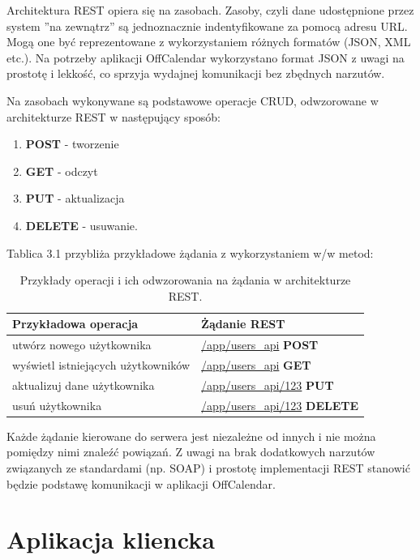 Architektura REST opiera się na zasobach. Zasoby, czyli dane udostępnione przez system ''na zewnątrz'' są jednoznacznie indentyfikowane za pomocą adresu URL. Mogą one być reprezentowane z wykorzystaniem różnych formatów (JSON, XML etc.). Na potrzeby aplikacji OffCalendar wykorzystano format JSON z uwagi na prostotę i lekkość, co sprzyja wydajnej komunikacji bez zbędnych narzutów.

Na zasobach wykonywane są podstawowe operacje CRUD, odwzorowane w architekturze REST w następujący sposób:

\begin{enumerate}
\item\textbf{POST} - tworzenie
\item \textbf{GET} - odczyt
\item \textbf{PUT} - aktualizacja
\item \textbf{DELETE} - usuwanie.
\end{enumerate}

Tablica 3.1 przybliża przykładowe żądania z wykorzystaniem w/w metod\cite{rest2}:

\begin{table}[h]
\centering
    \begin{tabular}{ | p{7cm} | p{7cm} | }
    \hline
    \textbf{Przykładowa operacja} & \textbf{Żądanie REST} \\ \hline
	utwórz nowego użytkownika & \url{/app/users_api} \textbf{POST}
	\\ \hline
	wyświetl istniejących użytkowników & \url{/app/users_api} \textbf{GET}
	\\ \hline
	aktualizuj dane użytkownika & \url{/app/users_api/123} \textbf{PUT}
	\\ \hline
	usuń użytkownika & \url{/app/users_api/123} \textbf{DELETE}
	\\ \hline
    \end{tabular}
	\caption{Przykłady operacji i ich odwzorowania na żądania w architekturze REST.}
\end{table}

Każde żądanie kierowane do serwera jest niezależne od innych i nie można pomiędzy nimi znaleźć powiązań. Z uwagi na brak dodatkowych narzutów związanych ze standardami (np. SOAP) i prostotę implementacji REST stanowić będzie podstawę komunikacji w aplikacji OffCalendar\cite{rest3}\cite{rest4}.

\section{Aplikacja kliencka}
\label{sec:appKliencka}

